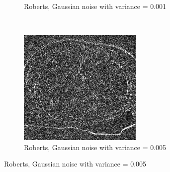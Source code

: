 \begin{figure}[H]
\begin{subfigure}{.5\textwidth}
    \caption{Roberts, Gaussian noise with variance = 0.001}
    \label{fig:robert_001}
  \end{subfigure}\\%
  \begin{subfigure}{.5\textwidth}
    \centering
    \includegraphics[width=.9\textwidth]{./edgedetection/images/robert_005_noise}
    \caption{Roberts, Gaussian noise with variance = 0.005}
    \label{fig:robert_005}
  \end{subfigure}%
  
\end{figure}
